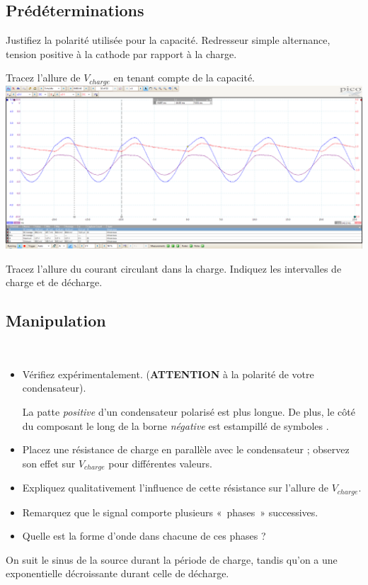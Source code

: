 \documentclass{../template/labo}
\begin{document}
\subsection{Prédéterminations}

\begin{predet}
\Question
{
	Justifiez la polarité utilisée pour la capacité.
}
{Redresseur simple alternance, tension positive à la cathode par rapport à la charge.}%
	\label{Q:10}

\Question
{
	Tracez l'allure de $V_{charge}$ en tenant compte de la capacité.
}
{
	\includegraphics[width=\linewidth]{figures/redresseur_10k_filtre.png}
}%
	\label{Q:11}


\Question
{
	Tracez l'allure du courant circulant dans la charge. Indiquez les intervalles de charge et de décharge.
}
{}%
	\label{Q:12}
\end{predet}

\subsection{Manipulation}

\begin{manip}
\Question
{~\\
\begin{itemize}
\item Vérifiez expérimentalement. (\textbf{ATTENTION} à la polarité de votre condensateur).
\begin{astuce}
	La patte \textit{positive} d'un condensateur polarisé est plus longue.
	De plus, le côté du composant le long de la borne \textit{négative} est estampillé de symboles \faMinus.
\end{astuce}
\item Placez une résistance de charge en parallèle avec le condensateur ; observez son effet sur $V_{charge}$ pour différentes valeurs.
\item Expliquez qualitativement l'influence de cette résistance sur l'allure de $V_{charge}$.
\item Remarquez que le signal comporte plusieurs «~phases~» successives.
\item Quelle est la forme d'onde dans chacune de ces phases ?
\end{itemize}

}
{On suit le sinus de la source durant la période de charge, tandis qu'on a une exponentielle décroissante durant celle de décharge.}%
	\label{Q:13}
\end{manip}
\end{document}

